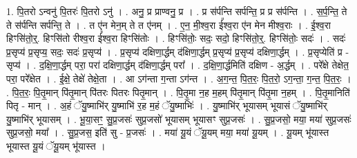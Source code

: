 \documentclass[17pt]{extarticle}
\begin{document}
1. पि॒तरो ऽन्वनु॑ पि॒तरः॑ पि॒तरो ऽनु॑ । . अनु॒ प्र प्राण्वनु॒ प्र । . प्र स॑र्पन्ति सर्पन्ति॒ प्र प्र स॑र्पन्ति । . स॒र्प॒न्ति॒ ते ते स॑र्पन्ति सर्पन्ति॒ ते । . त ए॑न मेन॒म् ते त ए॑नम् । . ए॒न॒ मी॒श्व॒रा ई᳚श्व॒रा ए॑न मेन मीश्व॒राः । . ई॒श्व॒रा हिꣳसि॑तो॒र्॒. हिꣳसि॑तो रीश्व॒रा ई᳚श्व॒रा हिꣳसि॑तोः । . हिꣳसि॑तोः॒ सदः॒ सदो॒ हिꣳसि॑तो॒र्॒. हिꣳसि॑तोः॒ सदः॑ । . सदः॑ प्र॒सृप्य॑ प्र॒सृप्य॒ सदः॒ सदः॑ प्र॒सृप्य॑ । . प्र॒सृप्य॑ दक्षिणा॒र्द्धम् द॑क्षिणा॒र्द्धम् प्र॒सृप्य॑ प्र॒सृप्य॑ दक्षिणा॒र्द्धम् । . प्र॒सृप्येति॑ प्र - सृप्य॑ । . द॒क्षि॒णा॒र्द्धम् परा॒ परा॑ दक्षिणा॒र्द्धम् द॑क्षिणा॒र्द्धम् परा᳚ । . द॒क्षि॒णा॒र्द्धमिति॑ दक्षिण - अ॒र्द्धम् । . परे᳚क्षे तेक्षेत॒ परा॒ परे᳚क्षेत । . ई॒क्षे॒ तेक्षे॑ तेक्षे॒ता । . आ ऽग॑न्ता ग॒न्ता ऽग॑न्त । . अ॒ग॒न्त॒ पि॒त॒रः॒ पि॒त॒रो॒ ऽग॒न्ता॒ ग॒न्त॒ पि॒त॒रः॒ । . पि॒त॒रः॒ पि॒तृ॒मान् पि॑तृ॒मान् पि॑तरः पितरः पितृ॒मान् । . पि॒तृ॒मा न॒ह म॒हम् पि॑तृ॒मान् पि॑तृ॒मा न॒हम् । . पि॒तृ॒मानिति॑ पितृ - मान् । . अ॒हं ॅयु॒ष्माभि॑र् यु॒ष्माभि॑ र॒ह म॒हं ॅयु॒ष्माभिः॑ । . यु॒ष्माभि॑र् भूयासम् भूयासं ॅयु॒ष्माभि॑र् यु॒ष्माभि॑र् भूयासम् । . भू॒या॒सꣳ॒॒ सु॒प्र॒जसः॑ सुप्र॒जसो॑ भूयासम् भूयासꣳ सुप्र॒जसः॑ । . सु॒प्र॒जसो॒ मया॒ मया॑ सुप्र॒जसः॑ सुप्र॒जसो॒ मया᳚ । . सु॒प्र॒जस॒ इति॑ सु - प्र॒जसः॑ । . मया॑ यू॒यं ॅयू॒यम् मया॒ मया॑ यू॒यम् । . यू॒यम् भू॑यास्त भूयास्त यू॒यं ॅयू॒यम् भू॑यास्त । \newline
\end{document}
